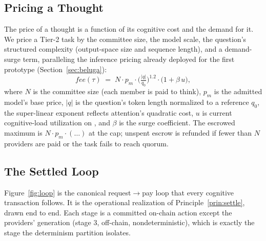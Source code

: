 \subsection{Pricing a Thought}

The price of a thought is a function of its cognitive cost and the demand for it. We price a Tier-2 task by the committee size, the model scale, the question's structured complexity (output-space size and sequence length), and a demand-surge term, paralleling the inference pricing already deployed for the first prototype (Section~\ref{sec:beluga}):
\begin{equation}
\label{eq:price}
\mathit{fee}(\tau) \;=\; N \cdot p_m \cdot \Big(\tfrac{|q|}{q_0}\Big)^{1.2} \cdot \big(1 + \beta\, u\big),
\end{equation}
where $N$ is the committee size (each member is paid to think), $p_m$ is the admitted model's base price, $|q|$ is the question's token length normalized to a reference $q_0$, the super-linear exponent reflects attention's quadratic cost, $u$ is current cognitive-load utilization on \AChain{}, and $\beta$ is the surge coefficient. The escrowed maximum is $N \cdot p_m \cdot (\dots)$ at the cap; unspent escrow is refunded if fewer than $N$ providers are paid or the task fails to reach quorum.

\subsection{The Settled Loop}

Figure~\ref{fig:loop} is the canonical request$\to$pay loop that every cognitive transaction follows. It is the operational realization of Principle~\ref{prin:settle}, drawn end to end. Each stage is a committed on-chain action except the providers' generation (stage 3, off-chain, nondeterministic), which is exactly the stage the determinism partition isolates.

